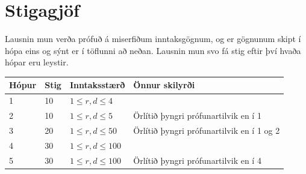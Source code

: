 \section*{Stigagjöf}
Lausnin mun verða prófuð á miserfiðum inntaksgögnum, og er gögnunum skipt í
hópa eins og sýnt er í töflunni að neðan. Lausnin mun svo fá stig eftir því
hvaða hópar eru leystir.

\begin{tabular}{| l | l | l | l |}
\hline
Hópur & Stig       & Inntaksstærð          & Önnur skilyrði\\ \hline
1     & 10         & $1 \leq r,d \leq 4$   & \\ \hline
2     & 10         & $1 \leq r,d \leq 5$   & Örlítið þyngri prófunartilvik en í 1 \\ \hline
3     & 20         & $1 \leq r,d \leq 50$  & Örlítið þyngri prófunartilvik en í 1 og 2 \\ \hline
4     & 30         & $1 \leq r,d \leq 100$ & \\ \hline
5     & 30         & $1 \leq r,d \leq 100$ & Örlítið þyngri prófunartilvik en í 4\\ \hline
\end{tabular}
